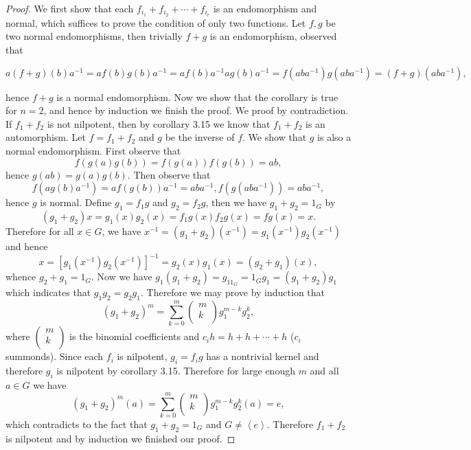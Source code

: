 \begin{proof}
We first show that each $f_{i_1}+f_{i_2}+\cdots+f_{i_r}$ is an endomorphism and normal, which suffices to prove the condition of only two functions. Let $f,g$ be two normal endomorphisms, then trivially $f+g$ is an endomorphism, observed that 
\begin{small}
$$
a\left( f+g \right) \left( b \right) a^{-1}=af\left( b \right) g\left( b \right) a^{-1}=af\left( b \right) a^{-1}ag\left( b \right) a^{-1}=f\left( aba^{-1} \right) g\left( aba^{-1} \right) =\left( f+g \right) \left( aba^{-1} \right) ,
$$
\end{small}
hence $f+g$ is a normal endomorphism. Now we show that the corollary is true for $n=2$, and hence by induction we finish the proof. We proof by contradiction. If $f_1+f_2$ is not nilpotent, then by corollary 3.15 we know that $f_1+f_2$ is an automorphism. Let $f=f_1+f_2$ and $g$ be the inverse of $f$. We show that $g$ is also a normal endomorphism. First observe that 
$$
f\left( g\left( a \right) g\left( b \right) \right) =f\left( g\left( a \right) \right) f\left( g\left( b \right) \right) =ab,
$$
hence $g(ab)=g(a)g(b)$. Then observe that 
$$
f\left( ag\left( b \right) a^{-1} \right) =af\left( g\left( b \right) \right) a^{-1}=aba^{-1},f\left( g\left( aba^{-1} \right) \right) =aba^{-1},
$$
hence $g$ is normal. Define $g_1=f_1g$ and $g_2=f_2g$, then we have $g_1+g_2=1_G$ by 
$$
\left( g_1+g_2 \right) x=g_1\left( x \right) g_2\left( x \right) =f_1g\left( x \right) f_2g\left( x \right) =fg\left( x \right) =x.
$$
Therefore for all $x\in G$, we have $x^{-1}=\left( g_1+g_2 \right) \left( x^{-1} \right) =g_1\left( x^{-1} \right) g_2\left( x^{-1} \right) $ and hence 
$$
x=\left[ g_1\left( x^{-1} \right) g_2\left( x^{-1} \right) \right] ^{-1}=g_2\left( x \right) g_1\left( x \right) =\left( g_2+g_1 \right) \left( x \right) ,
$$
whence $g_2+g_1=1_G$. Now we have $g_1\left( g_1+g_2 \right) =g_11_G=1_Gg_1=\left( g_1+g_2 \right) g_1$ which indicates that $g_1g_2=g_2g_1$. Therefore we may prove by induction that 
$$
\left( g_1+g_2 \right) ^m=\sum_{k=0}^m{\left( \begin{array}{c}
	m\\
	k\\
\end{array} \right) g_{1}^{m-k}g_{2}^{k}},
$$
where $
\left( \begin{array}{c}
	m\\
	k\\
\end{array} \right) 
$ is the binomial coefficients and $c_ih=h+h+\cdots+h$ ($c_i$ summonds). Since each $f_i$ is nilpotent, $g_i=f_ig$ has a nontrivial kernel and therefore $g_i$ is nilpotent by corollary 3.15. Therefore for large enough $m$ and all $a\in G$ we have 
$$
\left( g_1+g_2 \right) ^m\left( a \right) =\sum_{k=0}^m{\left( \begin{array}{c}
	m\\
	k\\
\end{array} \right) g_{1}^{m-k}g_{2}^{k}}\left( a \right) =e,
$$
which contradicts to the fact that $g_1+g_2=1_G$ and $G\ne\left<e\right>$. Therefore $f_1+f_2$ is nilpotent and by induction we finished our proof.
\end{proof}
